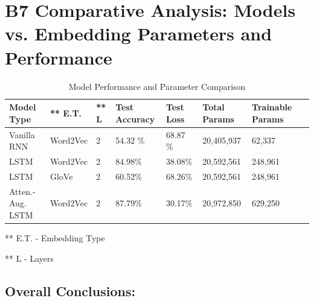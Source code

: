 \documentclass{article}
\begin{document}
\section{B7 Comparative Analysis: Models vs. Embedding Parameters and Performance}
\begin{table}[htbp]
\centering
\caption{Model Performance and Parameter Comparison}
\label{tab:model_comparison}
\begin{tabular}{llllllll}
\toprule
Model Type & ** E.T. & ** L & Test Accuracy & Test Loss & Total Params & Trainable Params \\
\midrule
Vanilla RNN & Word2Vec & 2 & 54.32 \%  & 68.87 \%  & 20,405,937 & 62,337 \\
LSTM & Word2Vec & 2 & 84.98\% & 38.08\% & 20,592,561 & 248,961 \\
LSTM & GloVe & 2 & 60.52\% & 68.26\% & 20,592,561 & 248,961 \\
Atten.-Aug. LSTM & Word2Vec & 2 & 87.79\% & 30.17\% & 20,972,850 & 629,250 \\
\bottomrule
\end{tabular}
\end{table}

** E.T. - Embedding Type

** L - Layers
\subsection*{Overall Conclusions:}
\end{document}
